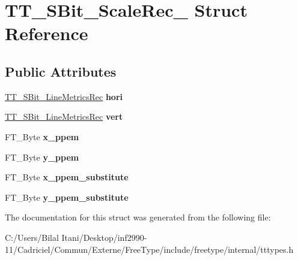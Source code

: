 \hypertarget{struct_t_t___s_bit___scale_rec__}{}\section{T\+T\+\_\+\+S\+Bit\+\_\+\+Scale\+Rec\+\_\+ Struct Reference}
\label{struct_t_t___s_bit___scale_rec__}
\subsection*{Public Attributes}
\begin{DoxyCompactItemize}
\item 
\hyperlink{struct_t_t___s_bit___line_metrics_rec__}{T\+T\+\_\+\+S\+Bit\+\_\+\+Line\+Metrics\+Rec} {\bfseries hori}\hypertarget{struct_t_t___s_bit___scale_rec___a2a61bc97ebb7ed996170a03612ffbbc0}{}\label{struct_t_t___s_bit___scale_rec___a2a61bc97ebb7ed996170a03612ffbbc0}

\item 
\hyperlink{struct_t_t___s_bit___line_metrics_rec__}{T\+T\+\_\+\+S\+Bit\+\_\+\+Line\+Metrics\+Rec} {\bfseries vert}\hypertarget{struct_t_t___s_bit___scale_rec___acbf5c459602d9f52ac04a914e2f12375}{}\label{struct_t_t___s_bit___scale_rec___acbf5c459602d9f52ac04a914e2f12375}

\item 
F\+T\+\_\+\+Byte {\bfseries x\+\_\+ppem}\hypertarget{struct_t_t___s_bit___scale_rec___a235731b0452ea063cccacd2f59b3f44c}{}\label{struct_t_t___s_bit___scale_rec___a235731b0452ea063cccacd2f59b3f44c}

\item 
F\+T\+\_\+\+Byte {\bfseries y\+\_\+ppem}\hypertarget{struct_t_t___s_bit___scale_rec___aa4c1fb419ea55c8c587ba81700c6ce66}{}\label{struct_t_t___s_bit___scale_rec___aa4c1fb419ea55c8c587ba81700c6ce66}

\item 
F\+T\+\_\+\+Byte {\bfseries x\+\_\+ppem\+\_\+substitute}\hypertarget{struct_t_t___s_bit___scale_rec___a71955e363b0b5da84ed2c15d0e6f832d}{}\label{struct_t_t___s_bit___scale_rec___a71955e363b0b5da84ed2c15d0e6f832d}

\item 
F\+T\+\_\+\+Byte {\bfseries y\+\_\+ppem\+\_\+substitute}\hypertarget{struct_t_t___s_bit___scale_rec___a3a9f554d0153f9e3022898c1f59a7b63}{}\label{struct_t_t___s_bit___scale_rec___a3a9f554d0153f9e3022898c1f59a7b63}

\end{DoxyCompactItemize}


The documentation for this struct was generated from the following file\+:\begin{DoxyCompactItemize}
\item 
C\+:/\+Users/\+Bilal Itani/\+Desktop/inf2990-\/11/\+Cadriciel/\+Commun/\+Externe/\+Free\+Type/include/freetype/internal/tttypes.\+h\end{DoxyCompactItemize}
